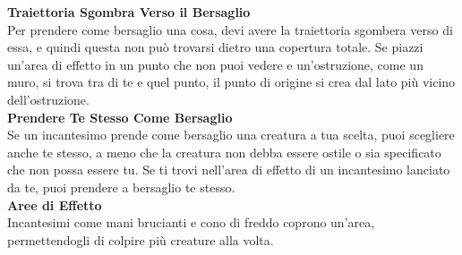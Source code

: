 \textbf{Traiettoria Sgombra Verso il Bersaglio}\\
Per prendere come bersaglio una cosa, devi avere la traiettoria sgombera verso di essa, e quindi questa non può trovarsi dietro una copertura totale. Se piazzi un'area di effetto in un punto che non puoi vedere e un'ostruzione, come un muro, si trova tra di te e quel punto, il punto di origine si crea dal lato più vicino dell'ostruzione.\\

\textbf{Prendere Te Stesso Come Bersaglio} \\
Se un incantesimo prende come bersaglio una creatura a tua scelta, puoi scegliere anche te stesso, a meno che la creatura non debba essere ostile o sia specificato che non possa essere tu. Se ti trovi nell'area  di effetto di un incantesimo lanciato da te, puoi  prendere a bersaglio te stesso.\\

\textbf{Aree di Effetto}\\
Incantesimi come mani brucianti e cono di freddo coprono un'area, permettendogli di colpire più creature alla volta.\\

